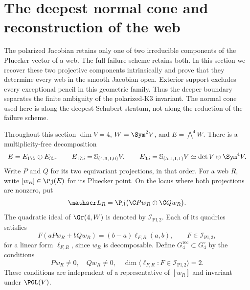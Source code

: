 \section{The deepest normal cone and reconstruction of the web}
\label{sec:intrinsic-web-reconstruction}

The polarized Jacobian retains only one of two irreducible components
of the Pluecker vector of a web.  The full failure scheme retains
both.  In this section we recover these two projective components
intrinsically and prove that they determine every web in the smooth
Jacobian open.  Exterior support excludes every exceptional pencil
in this geometric family.  Thus the deeper boundary separates the
finite ambiguity of the polarized-K3 invariant.  The normal cone
used here is along the deepest Schubert stratum, not along the
reduction of the failure scheme.

Throughout this section \(\dim V=4\), \(W=\Sym^2V\), and
\(E=\bigwedge^4W\).  There is a multiplicity-free decomposition
\begin{equation}\label{eq:two-web-components}
 E=E_{175}\oplus E_{35},\qquad
 E_{175}=\mathbb S_{(4,3,1,0)}V,\qquad
 E_{35}=\mathbb S_{(5,1,1,1)}V
       \simeq\det V\otimes\Sym^4V.
\end{equation}
Write \(P\) and \(Q\) for its two equivariant projections, in
that order.  For a web \(R\), write \([w_R]\in\Pj(E)\) for
its Pluecker point.  On the locus where both projections are nonzero,
put
\[
 \mathscr L_R=\Pj\bigl(\C Pw_R\oplus\C Qw_R\bigr).
\]
The quadratic ideal of \(\Gr(4,W)\) is denoted by
\(\mathcal I_{\mathrm{Pl},2}\).  Each of its quadrics satisfies
\begin{equation}\label{eq:plucker-linear-quotient}
 F(aPw_R+bQw_R)=(b-a)\ell_{F,R}(a,b),
 \qquad F\in\mathcal I_{\mathrm{Pl},2},
\end{equation}
for a linear form \(\ell_{F,R}\), since \(w_R\) is decomposable.
Define \(G_4^{\mathrm{rec}}\subset G_4^\circ\) by the conditions
\begin{equation}\label{eq:reconstruction-open}
 Pw_R\ne0,\quad Qw_R\ne0,\quad
 \dim\langle\ell_{F,R}:F\in\mathcal I_{\mathrm{Pl},2}\rangle=2.
\end{equation}
These conditions are independent of a representative of \([w_R]\)
and invariant under \(\PGL(V)\).

